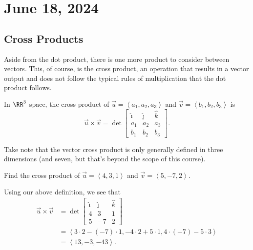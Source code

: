 \chapter{June 18, 2024}

\section{Cross Products}

Aside from the dot product, there is one more product to consider between vectors. This, of course, is the cross product, an operation that results in a vector output and does not follow the typical rules of multiplication that the dot product follows.

\begin{definition}
    In $\RR^{3}$ space, the cross product of $\vec{u} = \left<a_{1}, a_{2}, a_{3}\right>$ and $\vec{v} = \left<b_{1}, b_{2}, b_{3}\right>$ is
    \[\vec{u} \times \vec{v} = \det \begin{bmatrix} \hat{\imath} & \hat{\jmath} & \hat{k} \\ a_{1} & a_{2} & a_{3} \\ b_{1} & b_{2} & b_{3} \end{bmatrix}.\]
\end{definition}

\begin{remark}
    Take note that the vector cross product is only generally defined in three dimensions (and seven, but that's beyond the scope of this course).
\end{remark}

\begin{example}
    Find the cross product of $\vec{u} = \left<4, 3, 1\right>$ and $\vec{v} = \left<5, -7, 2\right>$.

    \begin{soln}
        Using our above definition, we see that
        \begin{align*}
            \vec{u} \times \vec{v} &= \det \begin{bmatrix}
                \hat{\imath} & \hat{\jmath} & \hat{k} \\
                4 & 3 & 1 \\
                5 & -7 & 2
            \end{bmatrix} \\
            &= \left<3 \cdot 2 - (-7) \cdot 1, -4 \cdot 2 + 5 \cdot 1, 4 \cdot (-7) - 5 \cdot 3\right> \\
            &= \left<13, -3, -43\right>.
        \end{align*}
    \end{soln}
\end{example}

